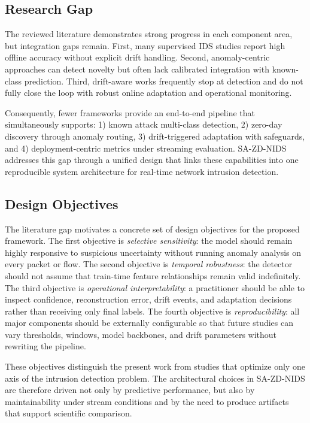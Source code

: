 \documentclass[conference]{IEEEtran}
\begin{document}
\subsection{Research Gap}
The reviewed literature demonstrates strong progress in each component area, but integration gaps remain. First, many supervised IDS studies report high offline accuracy without explicit drift handling. Second, anomaly-centric approaches can detect novelty but often lack calibrated integration with known-class prediction. Third, drift-aware works frequently stop at detection and do not fully close the loop with robust online adaptation and operational monitoring.

Consequently, fewer frameworks provide an end-to-end pipeline that simultaneously supports: 1) known attack multi-class detection, 2) zero-day discovery through anomaly routing, 3) drift-triggered adaptation with safeguards, and 4) deployment-centric metrics under streaming evaluation. SA-ZD-NIDS addresses this gap through a unified design that links these capabilities into one reproducible system architecture for real-time network intrusion detection.

\subsection{Design Objectives}
The literature gap motivates a concrete set of design objectives for the proposed framework. The first objective is \emph{selective sensitivity}: the model should remain highly responsive to suspicious uncertainty without running anomaly analysis on every packet or flow. The second objective is \emph{temporal robustness}: the detector should not assume that train-time feature relationships remain valid indefinitely. The third objective is \emph{operational interpretability}: a practitioner should be able to inspect confidence, reconstruction error, drift events, and adaptation decisions rather than receiving only final labels. The fourth objective is \emph{reproducibility}: all major components should be externally configurable so that future studies can vary thresholds, windows, model backbones, and drift parameters without rewriting the pipeline.

These objectives distinguish the present work from studies that optimize only one axis of the intrusion detection problem. The architectural choices in SA-ZD-NIDS are therefore driven not only by predictive performance, but also by maintainability under stream conditions and by the need to produce artifacts that support scientific comparison.
\end{document}

